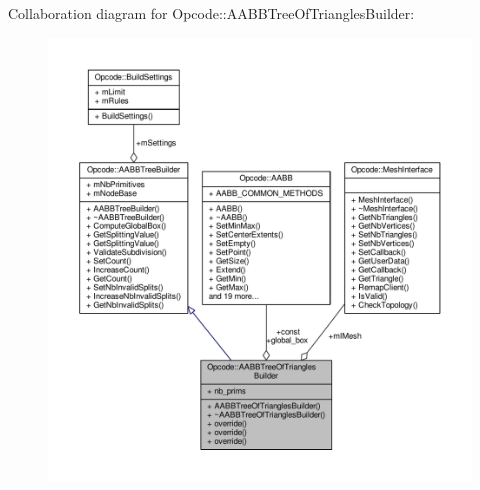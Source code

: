 Collaboration diagram for Opcode\+:\+:A\+A\+B\+B\+Tree\+Of\+Triangles\+Builder\+:
\nopagebreak
\begin{figure}[H]
\begin{center}
\leavevmode
\includegraphics[width=350pt]{d8/df9/classOpcode_1_1AABBTreeOfTrianglesBuilder__coll__graph}
\end{center}
\end{figure}

